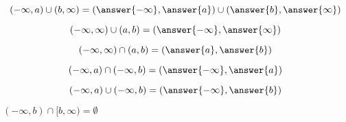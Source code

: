 \documentclass{ximera}
\begin{document}
\begin{question}
\[
(-\infty, a) \cup (b, \infty) = \left( \answer{-\infty}, \answer{a} \right) \cup \left( \answer{b}, \answer{\infty} \right)
\]
\end{question}








\begin{question}
\[
(-\infty, \infty) \cup (a, b) = \left( \answer{-\infty}, \answer{\infty} \right)
\]
\end{question}






\begin{question}
\[
(-\infty, \infty) \cap (a, b) = \left( \answer{a}, \answer{b} \right)
\]
\end{question}





\begin{question}
\[
(-\infty, a) \cap (-\infty, b) = \left( \answer{-\infty}, \answer{a} \right)
\]
\end{question}




\begin{question}
\[
(-\infty, a) \cup (-\infty, b) = \left( \answer{-\infty}, \answer{b} \right)
\]
\end{question}



\begin{question}

$(-\infty, b) \cap [b, \infty) = \emptyset$

\begin{multipleChoice}
\end{multipleChoice}

\end{question}
\end{document}

